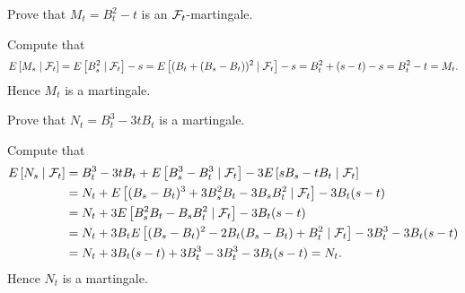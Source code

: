 \begin{exercise}{3.5}\label{ex:3.5}
    Prove that $M_t = B_t^2 - t$ is an $\mathcal{F}_t$-martingale.
\end{exercise}
\begin{solution}
    Compute that 
    \begin{equation*}
        E\left[ {M_s\mid\mathcal{F}_t} \right] = E\left[ {B_s^2\mid\mathcal{F}_t} \right] - s 
        = E\left[ {(B_t + (B_s - B_t))^2\mid\mathcal{F}_t} \right] - s 
        = B_t^2 + (s-t) - s = B_t^2 - t = M_t.
    \end{equation*}
    Hence $M_t$ is a martingale.
\end{solution}

\begin{exercise}{3.6}\label{ex:3.6}
    Prove that $N_t = B_t^3 - 3tB_t$ is a martingale.
\end{exercise}
\begin{solution}
    Compute that 
    \begin{equation*}
        \begin{split}
            E\left[ {N_s\mid\mathcal{F}_t} \right] &= B_t^3 - 3tB_t + E\left[ {B_s^3-B_t^3\mid\mathcal{F}_t} \right] - 3E\left[ {sB_s-tB_t\mid\mathcal{F}_t} \right] \\ 
            &= N_t + E\left[ {(B_s - B_t)^3 + 3B_s^2B_t - 3B_sB_t^2\mid\mathcal{F}_t} \right] - 3B_t(s-t) \\ 
            &= N_t + 3E\left[ {B_s^2B_t - B_sB_t^2\mid\mathcal{F}_t} \right] - 3B_t(s-t) \\  
            &= N_t + 3B_tE\left[ {(B_s - B_t)^2 - 2B_t(B_s - B_t) + B_t^2\mid\mathcal{F}_t} \right] - 3B_t^3 - 3B_t(s-t) \\ 
            &= N_t + 3B_t(s-t) + 3B_t^3 - 3B_t^3 - 3B_t(s-t) = N_t.
        \end{split}
    \end{equation*}
    Hence $N_t$ is a martingale.
\end{solution}

